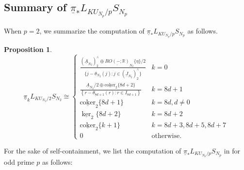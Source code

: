 \documentclass{amsart}
\theoremstyle{plain}
\newtheorem{proposition}[theorem]{Proposition}
\theoremstyle{definition}
\theoremstyle{remark}
\begin{document}
\subsection{Summary of $\underline{\pi}_* L_{KU_{N_p}/p}S_{N_p}$} When $p=2$, we summarize the computation of $\underline{\pi}_* L_{KU_{N_p}/p}S_{N_p}$ as follows.

\begin{proposition}\label{lem:extension of 2 group KU local sphere}
    \[
\underline{\pi}_k L_{KU_{N_2}/2}S_{N_2} \cong \begin{cases}
    \frac{(\underline{A}_{N_2})_2^\wedge \oplus \underline{RO(-;\mathbb{R})}_{N_2}\{\eta\}/2}{\{j-\theta_{N_2}(j):j\in (\underline{J}_{N_2})_2^\wedge\}} & k=0\\    
    \frac{ \underline A_{N_2}/2 \oplus \underline{\mathrm{coker}}_2\{8d+2\} }{\left\{ r-\theta_{8d+1}(r): r\in I_{8d+1} \right\}} & k=8d+1\\
    \underline{\mathrm{coker}}_2\{8d+1\} & k=8d, d\neq 0\\
    \underline{\ker}_2\{8d+2\} & k=8d+2\\
    \underline{\mathrm{coker}}_2\{k+1\} & k=8d+3, 8d+5, 8d+7\\
    0 & \text{otherwise}.
\end{cases}
\]



\end{proposition}

For the sake of self-containment, we list the computation of $\underline{\pi}_* L_{KU_{N_p}/p}S_{N_p}$ in \cite{carawan2023homotopy} for odd prime $p$ as follows:
\end{document}
